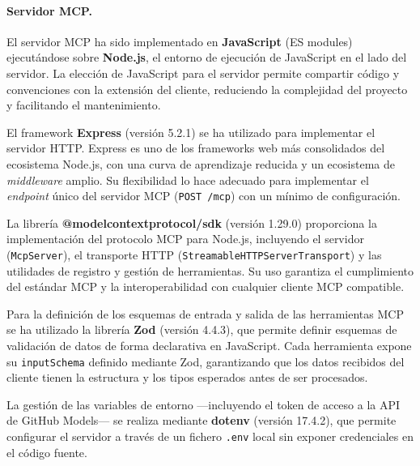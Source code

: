 \begin{center}
\hspace{0.8cm}%
\hspace{0.8cm}%
\hspace{0.8cm}%
%
\end{center}

\paragraph{Servidor MCP.}

El servidor MCP ha sido implementado en \textbf{JavaScript} (ES modules) ejecutándose sobre \textbf{Node.js}, el entorno de ejecución de JavaScript en el lado del servidor. La elección de JavaScript para el servidor permite compartir código y convenciones con la extensión del cliente, reduciendo la complejidad del proyecto y facilitando el mantenimiento.

El framework \textbf{Express} (versión 5.2.1) se ha utilizado para implementar el servidor HTTP. Express es uno de los frameworks web más consolidados del ecosistema Node.js, con una curva de aprendizaje reducida y un ecosistema de \textit{middleware} amplio. Su flexibilidad lo hace adecuado para implementar el \textit{endpoint} único del servidor MCP (\texttt{POST /mcp}) con un mínimo de configuración.

La librería \textbf{@modelcontextprotocol/sdk} (versión 1.29.0) proporciona la implementación del protocolo MCP para Node.js, incluyendo el servidor (\texttt{McpServer}), el transporte HTTP (\texttt{StreamableHTTPServerTransport}) y las utilidades de registro y gestión de herramientas. Su uso garantiza el cumplimiento del estándar MCP y la interoperabilidad con cualquier cliente MCP compatible.

Para la definición de los esquemas de entrada y salida de las herramientas MCP se ha utilizado la librería \textbf{Zod} (versión 4.4.3), que permite definir esquemas de validación de datos de forma declarativa en JavaScript. Cada herramienta expone su \texttt{inputSchema} definido mediante Zod, garantizando que los datos recibidos del cliente tienen la estructura y los tipos esperados antes de ser procesados.

La gestión de las variables de entorno —incluyendo el token de acceso a la API de GitHub Models— se realiza mediante \textbf{dotenv} (versión 17.4.2), que permite configurar el servidor a través de un fichero \texttt{.env} local sin exponer credenciales en el código fuente.


